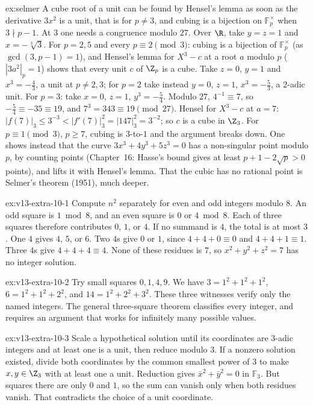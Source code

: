 \begin{solution}{ex:selmer}
\idea A cube root of a unit can be found by Hensel's lemma as soon as the derivative $3x^2$ is a unit, that is for $p\ne3$, and
cubing is a bijection on $\mathbb F_p^\times$ when $3\nmid p-1$. At $3$ one needs a congruence modulo $27$.
\writeup Over $\R$, take $y=z=1$ and $x=-\sqrt[3]3$. For $p=2,5$ and every $p\equiv2\pmod3$: cubing is a bijection of
$\mathbb F_p^\times$ (as $\gcd(3,p-1)=1$), and Hensel's lemma for $X^3-c$ at a root $a$ modulo $p$ ($|3a^2|_p=1$) shows that every
unit $c$ of $\Z_p$ is a cube. Take $z=0$, $y=1$ and $x^3=-\frac43$, a unit at $p\ne2,3$; for $p=2$ take instead $y=0$, $z=1$,
$x^3=-\frac53$, a $2$-adic unit. For $p=3$: take $x=0$, $z=1$, $y^3=-\frac54$. Modulo $27$, $4^{-1}\equiv7$, so $-\frac54\equiv-35
\equiv19$, and $7^3=343\equiv19\pmod{27}$. Hensel for $X^3-c$ at $a=7$: $|f(7)|_3\le3^{-3}<|f'(7)|_3^2=|147|_3^2=3^{-2}$; so $c$ is a
cube in $\Z_3$. For $p\equiv1\pmod3$, $p\ge7$, cubing is $3$-to-$1$ and the argument breaks down. One shows instead that the curve
$3x^3+4y^3+5z^3=0$ has a non-singular point modulo $p$, by counting points (Chapter~16: Hasse's bound gives at least $p+1-2\sqrt p>0$
points), and lifts it with Hensel's lemma. That the cubic has no rational point is Selmer's theorem (1951), much deeper.
\end{solution}

\begin{solution}{ex:v13-extra-10-1}
\idea Compute $n^2$ separately for even and odd integers modulo $8$.
\writeup An odd square is $1\bmod8$, and an even square is $0$ or $4\bmod8$. Each of three squares therefore contributes $0$, $1$, or $4$. If no summand is $4$, the total is at most $3$. One $4$ gives $4$, $5$, or $6$. Two $4$s give $0$ or $1$, since $4+4+0\equiv0$ and $4+4+1\equiv1$. Three $4$s give $4+4+4\equiv4$. None of these residues is $7$, so $x^2+y^2+z^2=7$ has no integer solution.
\end{solution}

\begin{solution}{ex:v13-extra-10-2}
\idea Try small squares $0,1,4,9$.
\writeup We have $3=1^2+1^2+1^2$, $6=1^2+1^2+2^2$, and $14=1^2+2^2+3^2$. These three witnesses verify only the named integers. The general three-square theorem classifies every integer, and requires an argument that works for infinitely many possible values.
\end{solution}

\begin{solution}{ex:v13-extra-10-3}
\idea Scale a hypothetical solution until its coordinates are $3$-adic integers and at least one is a unit, then reduce modulo $3$.
\writeup If a nonzero solution existed, divide both coordinates by the common smallest power of $3$ to make $x,y\in\Z_3$ with at least one a unit. Reduction gives $\bar x^2+\bar y^2=0$ in $\mathbb F_3$. But squares there are only $0$ and $1$, so the sum can vanish only when both residues vanish. That contradicts the choice of a unit coordinate.
\end{solution}

